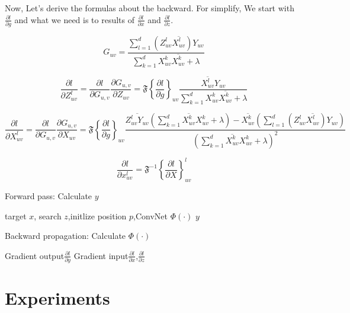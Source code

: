\documentclass[11pt]{article}
\begin{document}
Now, Let's derive the formulas about the backward. For simplify, We start with 
 $ \frac{\partial l}{\partial g} $ and what we need is to results of  $ \frac{\partial l}{\partial x} $ and $ \frac{\partial l}{\partial z} $.

$$
G_{uv}=\frac{\sum_{l=1}^{d}(Z_{uv}^{l}\overline{X_{uv}^{l}})Y_{uv}}{\sum_{k=1}^{d}X_{uv}^{k}\overline{X_{uv}^{k}}+\lambda}
$$

$$
\frac{\partial l}{\partial Z_{uv}^{l}}=\frac{\partial l}{\partial G_{u,v}}\frac{\partial G_{u,v}}{\partial Z_{uv}}=\mathfrak{F}\left\{\frac{\partial l}{\partial g}\right\}_{uv}  \frac{\overline{X_{uv}^{l}}Y_{uv}}{\sum_{k=1}^{d}X_{uv}^{k}\overline{X_{uv}^{k}}+\lambda}
$$

$$
\frac{\partial l}{\partial X_{uv}^{l}}
=\frac{\partial l}{\partial G_{u,v}}\frac{\partial G_{u,v}}{\partial X_{uv}}
=\mathfrak{F}\left\{\frac{\partial l}{\partial g}\right\}_{uv}
\frac{
\overline{Z_{uv}^{l}Y_{uv}}(\sum_{k=1}^{d}\overline{X_{uv}^{k}}X_{uv}^{k}+\lambda)-\overline{X_{uv}^{k}}(\sum_{l=1}^{d}(Z_{uv}^{l}\overline{X_{uv}^{l}})Y_{uv})}
{(\sum_{k=1}^{d}\overline{X_{uv}^{k}}X_{uv}^{k}+\lambda)^{2}}
$$
	
$$
\frac{\partial l}{\partial x_{uv}^{l}}
=\mathfrak{F}^{-1} \left\{ \frac{\partial l}{\partial X}\right\}_{uv}^l
$$


\begin{algorithm}
\caption{Forward pass: Calculate $y$}
\begin{algorithmic} 
\REQUIRE target $x$, search $z$,initlize position $p$,ConvNet $\Phi(\cdot)$
\RETURN $y$

 \ENDFOR
\end{algorithmic}
\end{algorithm}



\begin{algorithm}
\caption{Backward propagation: Calculate $\Phi(\cdot)$}
\begin{algorithmic} 
\REQUIRE Gradient output$\frac{\partial l}{\partial y}$
\RETURN Gradient input$\frac{\partial l}{\partial x}$,$\frac{\partial l}{\partial z}$

\end{algorithmic}
\end{algorithm}




\section{Experiments}
\end{document}
